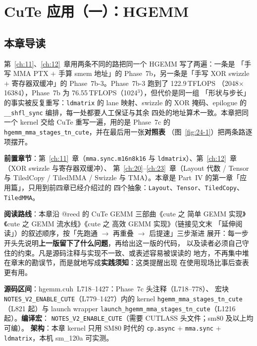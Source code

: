 \makeatletter
\providecommand{\urlchbrk}[1]{\@tfor\next:=#1\do{\next\allowbreak}}
\makeatother
\providecommand{\url}[1]{{\ttfamily\urlchbrk{#1}}}
\chapter{CuTe 应用（一）：HGEMM}\label{ch:24}

\section{本章导读}

第~\ref{ch:11}、\ref{ch:12}~章用两条不同的路把同一个 HGEMM 写了两遍：一条是
「手写 MMA PTX $+$ 手算 smem 地址」的 Phase~7b，另一条是「手写 XOR swizzle $+$
寄存器双缓冲」的 Phase~7b-3。Phase~7b-3 跑到了 122.9\,TFLOPS
（2048$\times$16384），Phase~7b 为 76.55\,TFLOPS（1024$^3$），但代价是同一组
「形状与步长」的事实被反复重写：\texttt{ldmatrix} 的 lane 映射、swizzle 的
XOR 掩码、epilogue 的 \texttt{\_\_shfl\_sync} 编排，每一处都要人工保证与其余
四处的地址算术一致。本章把同一个 kernel 交给 CuTe 重写一遍，用的是 Phase~7c 的
\texttt{hgemm\_\allowbreak{}mma\_\allowbreak{}stages\_\allowbreak{}tn\_\allowbreak{}cute}，并在最后用一张\textbf{对照表}
（图~\ref{fig:24-1}）把两条路逐项摆开。

\textbf{前置章节}：第~\ref{ch:11}~章（\texttt{mma.\allowbreak{}sync.\allowbreak{}m16n8k16} 与
\texttt{ldmatrix}）、第~\ref{ch:12}~章（XOR swizzle 与寄存器双缓冲）、
第~\ref{ch:20}--\ref{ch:23}~章（Layout 代数 / Tensor 与 TiledCopy / TiledMMA /
Swizzle 与 TMA）。本章是 Part~IV 的第一章「应用篇」，只用到前四章已经介绍过的
四个抽象：\texttt{Layout}、\texttt{Tensor}、\texttt{TiledCopy}、
\texttt{TiledMMA}。

\textbf{阅读路线}：本章沿 @reed 的 CuTe GEMM 三部曲《cute 之 简单 GEMM
实现》《cute 之 GEMM 流水线》《cute 之 高效 GEMM 实现》（链接见文末
「延伸阅读」）的叙述顺序，按「先跑通 $\to$ 再重叠 $\to$ 后提速」三步渐进
展开：每一步开头先说明\textbf{上一版留下了什么问题}，再给出这一版的代码，
以及读者必须自己守住的约束。凡是源码注释与实现不一致、或表述容易被误读的
地方，不再集中堆在章末的勘误节，而是就地写成\textbf{实践须知}：这类提醒出现
在使用现场比事后查表更有用。

\textbf{源码区间}：hgemm.cuh~L718--1427：Phase~7c 头注释（L718--778）、
宏块 \texttt{NOTES\_\allowbreak{}V2\_\allowbreak{}ENABLE\_\allowbreak{}CUTE}（L779--1427）内的 kernel
\texttt{hgemm\_\allowbreak{}mma\_\allowbreak{}stages\_\allowbreak{}tn\_\allowbreak{}cute}（L821 起）与 launch wrapper
\texttt{launch\_\allowbreak{}hgemm\_\allowbreak{}mma\_\allowbreak{}stages\_\allowbreak{}tn\_\allowbreak{}cute}（L1216 起）。\textbf{编译宏}：
\texttt{NOTES\_\allowbreak{}V2\_\allowbreak{}ENABLE\_\allowbreak{}CUTE}（需要 CUTLASS 头文件；sm80 及以上均可编）。
\textbf{架构}：本章 kernel 只用 SM80 时代的 \texttt{cp.async} $+$
\texttt{mma.sync} $+$ \texttt{ldmatrix}，本机 sm\_120a 可实测。

